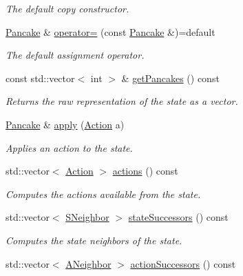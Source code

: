\begin{DoxyCompactItemize}
\begin{DoxyCompactList}\small\item\em The default copy constructor. \end{DoxyCompactList}\item 
\hyperlink{structpancake_1_1Pancake}{Pancake} \& \hyperlink{structpancake_1_1Pancake_a9d8ed231c77ca5e4cdc893496108bbd1}{operator=} (const \hyperlink{structpancake_1_1Pancake}{Pancake} \&)=default
\begin{DoxyCompactList}\small\item\em The default assignment operator. \end{DoxyCompactList}\item 
const std\+::vector$<$ int $>$ \& \hyperlink{structpancake_1_1Pancake_a31f7460c60492f7e0f63ae769ae2efb1}{get\+Pancakes} () const 
\begin{DoxyCompactList}\small\item\em Returns the raw representation of the state as a vector. \end{DoxyCompactList}\item 
\hyperlink{structpancake_1_1Pancake}{Pancake} \& \hyperlink{structpancake_1_1Pancake_a5e88f2656d094c9cfbae1767972ff0d3}{apply} (\hyperlink{structpancake_1_1Pancake_aad1b4a78f22485b896ac7e89aed5f099}{Action} a)
\begin{DoxyCompactList}\small\item\em Applies an action to the state. \end{DoxyCompactList}\item 
std\+::vector$<$ \hyperlink{structpancake_1_1Pancake_aad1b4a78f22485b896ac7e89aed5f099}{Action} $>$ \hyperlink{structpancake_1_1Pancake_a217891ca50e619613a29ffb7f9e68d73}{actions} () const 
\begin{DoxyCompactList}\small\item\em Computes the actions available from the state. \end{DoxyCompactList}\item 
std\+::vector$<$ \hyperlink{structpancake_1_1Pancake_a8155490ed19dac5a110c8f1dc14c7cd0}{S\+Neighbor} $>$ \hyperlink{structpancake_1_1Pancake_a30ec7e6d585397c793dbe4b0d7ac996c}{state\+Successors} () const 
\begin{DoxyCompactList}\small\item\em Computes the state neighbors of the state. \end{DoxyCompactList}\item 
std\+::vector$<$ \hyperlink{structpancake_1_1Pancake_abcc92cfb41db2b5949c326f8ca40aac7}{A\+Neighbor} $>$ \hyperlink{structpancake_1_1Pancake_ac190daa1d200bc9d26d942ddb204b23a}{action\+Successors} () const 

\end{DoxyCompactItemize}

